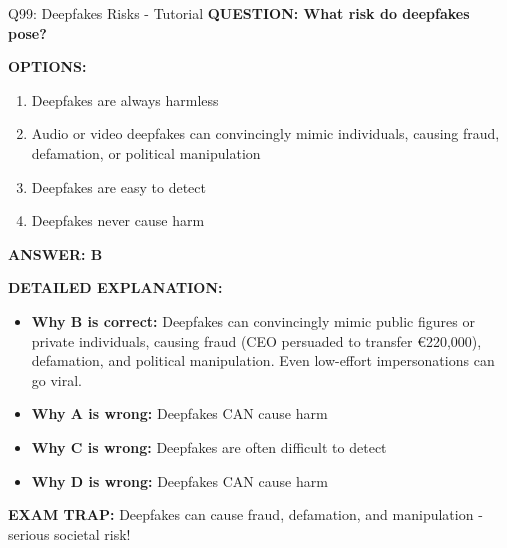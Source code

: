 \documentclass[8pt]{beamer}
\begin{document}
	\begin{frame}{Q99: Deepfakes Risks - Tutorial}
		\fontsize{6.5}{7.5}\selectfont
		\textbf{QUESTION: What risk do deepfakes pose?}
		
		\vspace{0.1cm}
		\textbf{OPTIONS:}
		\begin{enumerate}
			\item Deepfakes are always harmless
			\item Audio or video deepfakes can convincingly mimic individuals, causing fraud, defamation, or political manipulation
			\item Deepfakes are easy to detect
			\item Deepfakes never cause harm
		\end{enumerate}
		
		\vspace{0.1cm}
		\textcolor{myblue}{\textbf{ANSWER: B}}
		
		\vspace{0.1cm}
		\textbf{DETAILED EXPLANATION:}
		\begin{itemize}
			\item \textbf{Why B is correct:} Deepfakes can convincingly mimic public figures or private individuals, causing fraud (CEO persuaded to transfer €220,000), defamation, and political manipulation. Even low-effort impersonations can go viral.
			\item \textbf{Why A is wrong:} Deepfakes CAN cause harm
			\item \textbf{Why C is wrong:} Deepfakes are often difficult to detect
			\item \textbf{Why D is wrong:} Deepfakes CAN cause harm
		\end{itemize}
		
		\textcolor{myred}{\textbf{EXAM TRAP:}} Deepfakes can \textcolor{myblue}{cause fraud, defamation, and manipulation} - serious societal risk!
	\end{frame}
	
\end{document}
